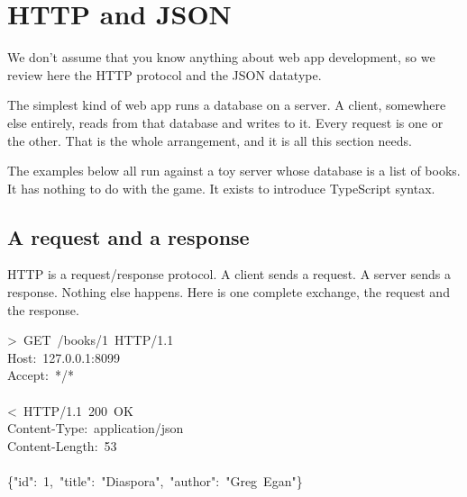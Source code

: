 \documentclass[11pt,a4paper]{article}
\begin{document}
\newpage

\section{HTTP and JSON}
\label{sec:http}

We don't assume that you know anything about web app development, so we review here the HTTP
protocol and the JSON datatype.

The simplest kind of web app runs a database on a server. A client, somewhere else entirely, reads
from that database and writes to it. Every request is one or the other. That is the whole
arrangement, and it is all this section needs.

The examples below all run against a toy server whose database is a list of books. It has nothing
to do with the game. It exists to introduce TypeScript syntax.

\subsection{A request and a response}

HTTP is a request/response protocol. A client sends a request. A server sends a response. Nothing
else happens. Here is one complete exchange, the request and the response.

\begin{center}
\colorbox{codebg}{\begin{minipage}{0.95\linewidth}\ttfamily\small
\setlength{\fboxsep}{1.5pt}\vspace{1mm}
\mbox{> GET /books/1 \colorbox{linebg}{HTTP/1.1}}\\
\hspace*{1em}\colorbox{hdrbg}{\mbox{Host: 127.0.0.1:8099}}\\
\hspace*{1em}\colorbox{hdrbg}{\mbox{Accept: */*}}\\
\mbox{}\\
\mbox{< \colorbox{linebg}{HTTP/1.1} 200 OK}\\
\hspace*{1em}\colorbox{hdrbg}{\mbox{Content-Type: application/json}}\\
\hspace*{1em}\colorbox{hdrbg}{\mbox{Content-Length: 53}}\\
\mbox{}\\
\hspace*{1em}\colorbox{bdybg}{\mbox{\{"id": 1, "title": "Diaspora", "author": "Greg Egan"\}}}
\vspace{1mm}
\end{minipage}}
\end{center}
\end{document}

